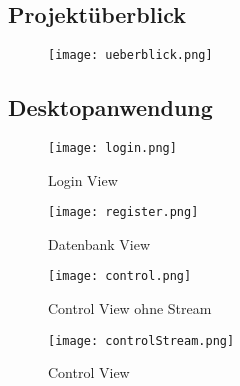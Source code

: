 

\chapter{}

\section{Projektüberblick}\label{A.überblick}

\begin{figure}[h]
  \begin{center}
    \texttt{[image: ueberblick.png]}
     \label{fig.Views}
  \end{center}
\end{figure}



\newpage



\section{Desktopanwendung}\label{A.desktop}

\begin{figure}[h]
\begin{minipage}[h]{8cm}
	\centering
	\texttt{[image: login.png]}
	\caption{Login View}
\end{minipage}
\hfill
\begin{minipage}[h]{8cm}
	\centering
	\texttt{[image: register.png]}
	\caption{Datenbank View}
\end{minipage}
\end{figure}


\vspace{3cm}


\begin{figure}[h]
\begin{minipage}[h]{8cm}
	\centering
	\texttt{[image: control.png]}
	\caption{Control View ohne Stream}
\end{minipage}
\hfill
\begin{minipage}[h]{8cm}
	\centering
	\texttt{[image: controlStream.png]}
	\caption{Control View}
\end{minipage}
\end{figure}

